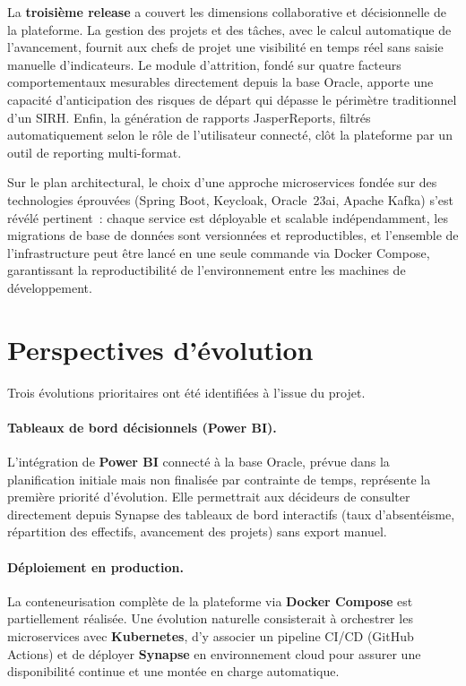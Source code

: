 \documentclass[12pt,a4paper,oneside]{report}
\begin{document}
La \textbf{troisième release} a couvert les dimensions collaborative et décisionnelle
de la plateforme. La gestion des projets et des tâches, avec le calcul automatique de
l'avancement, fournit aux chefs de projet une visibilité en temps réel sans saisie
manuelle d'indicateurs. Le module d'attrition, fondé sur quatre facteurs comportementaux
mesurables directement depuis la base Oracle, apporte une capacité d'anticipation
des risques de départ qui dépasse le périmètre traditionnel d'un SIRH. Enfin,
la génération de rapports JasperReports, filtrés automatiquement selon le rôle
de l'utilisateur connecté, clôt la plateforme par un outil de reporting multi-format.

Sur le plan architectural, le choix d'une approche microservices fondée sur des
technologies éprouvées (Spring Boot, Keycloak, Oracle~23ai, Apache Kafka)
s'est révélé pertinent~: chaque service est déployable et scalable indépendamment,
les migrations de base de données sont versionnées et reproductibles, et l'ensemble
de l'infrastructure peut être lancé en une seule commande via Docker Compose,
garantissant la reproductibilité de l'environnement entre les machines de
développement.

\section*{Perspectives d'évolution}

Trois évolutions prioritaires ont été identifiées à l'issue du projet.

\paragraph{Tableaux de bord décisionnels (Power BI).}
L'intégration de \textbf{Power BI} connecté à la base Oracle, prévue dans la
planification initiale mais non finalisée par contrainte de temps, représente la
première priorité d'évolution. Elle permettrait aux décideurs de consulter directement depuis Synapse des tableaux
de bord interactifs (taux d'absentéisme, répartition des effectifs, avancement des
projets) sans export manuel.

\paragraph{Déploiement en production.}
La conteneurisation complète de la plateforme via \textbf{Docker Compose} est
partiellement réalisée. Une évolution naturelle consisterait à orchestrer les
microservices avec \textbf{Kubernetes}, d'y associer un pipeline CI/CD
(GitHub Actions) et de déployer \textbf{Synapse} en environnement cloud pour
assurer une disponibilité continue et une montée en charge automatique.
\end{document}
